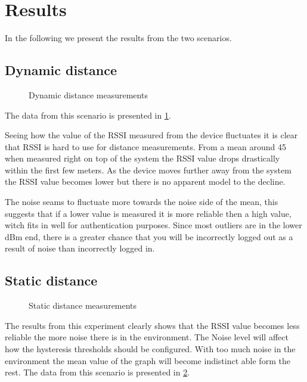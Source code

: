 \section{Results}
\label{sec_results}

In the following we present the results from the two scenarios.

\subsection{Dynamic distance}

\begin{figure}		
	
	
	
	\caption{ Dynamic distance measurements }
	\label{graf_DynamicMesurements}
	
\end{figure}

The data from this scenario is presented in \cref{graf_DynamicMesurements}.

Seeing how the value of the RSSI measured from the device fluctuates it is clear that RSSI is hard to use for distance measurements.
From a mean around 45 when measured right on top of the system the RSSI value drops drastically within the first few meters.
As the device moves further away from the system the RSSI value becomes lower but there is no apparent model to the decline.

The noise seams to fluctuate more towards the noise side of the mean, this suggests that if a lower value is measured it is more reliable then a high value, witch fits in well for authentication purposes.
Since most outliers are in the lower dBm end, there is a greater chance that you will be incorrectly logged out as a result of noise than incorrectly logged in.


\subsection{Static distance}
\begin{figure}
	
	
	\caption{Static distance measurements}
	\label{graf_StaticMesurements}
\end{figure}

The results from this experiment clearly shows that the RSSI value becomes less reliable the more noise there is in the environment.
The Noise level will affect how the hysteresis thresholds should be configured.
With too much noise in the environment the mean value of the graph will become indistinct able form the rest.
The data from this scenario is presented in \cref{graf_StaticMesurements}. 



